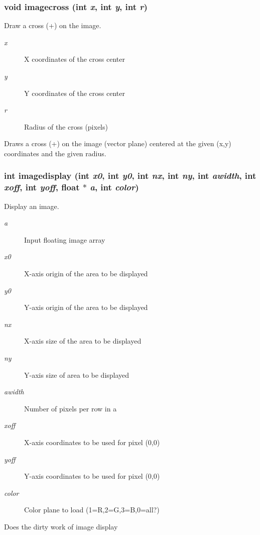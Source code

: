 \subsubsection{\setlength{\rightskip}{0pt plus 5cm}void imagecross (int {\em x}, int {\em y}, int {\em r})}\label{xtv_8h_a71}


Draw a cross (+) on the image. 

\begin{Desc}
\item[Parameters:]
\begin{description}
\item[{\em x}]X coordinates of the cross center \item[{\em y}]Y coordinates of the cross center \item[{\em r}]Radius of the cross (pixels)\end{description}
\end{Desc}
Draws a cross (+) on the image (vector plane) centered at the given (x,y) coordinates and the given radius. 
\subsubsection{\setlength{\rightskip}{0pt plus 5cm}int imagedisplay (int {\em x0}, int {\em y0}, int {\em nx}, int {\em ny}, int {\em awidth}, int {\em xoff}, int {\em yoff}, float $\ast$ {\em a}, int {\em color})}\label{xtv_8h_a62}


Display an image. 

\begin{Desc}
\item[Parameters:]
\begin{description}
\item[{\em a}]Input floating image array \item[{\em x0}]X-axis origin of the area to be displayed \item[{\em y0}]Y-axis origin of the area to be displayed \item[{\em nx}]X-axis size of the area to be displayed \item[{\em ny}]Y-axis size of area to be displayed \item[{\em awidth}]Number of pixels per row in a \item[{\em xoff}]X-axis coordinates to be used for pixel (0,0) \item[{\em yoff}]Y-axis coordinates to be used for pixel (0,0) \item[{\em color}]Color plane to load (1=R,2=G,3=B,0=all?)\end{description}
\end{Desc}
Does the dirty work of image display 
